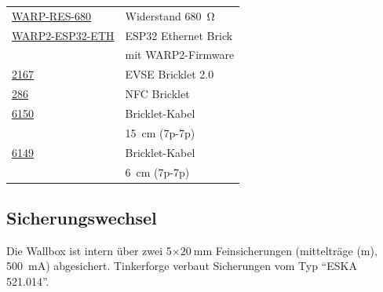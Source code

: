 \documentclass[a4paper,10pt]{article}
\begin{document}
\begin{multicols*}{2}
\begin{tabular}{ll}
        \cmidrule(lr{0.5em}){1-2}
        \href{https://www.tinkerforge.com/de/shop/warp/warp2-spare-parts/warp-res-680.html}{WARP-RES-680}                           & Widerstand \SI{680}{\ohm}            \\
        \cmidrule(lr{0.5em}){1-2}
        \href{https://www.tinkerforge.com/de/shop/warp/warp2-spare-parts/warp2-esp32-eth.html}{WARP2-ESP32-ETH}                        & ESP32 Ethernet Brick                 \\
                                                                                                                                    & mit WARP2-Firmware                   \\
        \cmidrule(lr{0.5em}){1-2}
        \href{https://www.tinkerforge.com/de/shop/warp/warp2-spare-parts/evse-v2-bricklet.html}{2167}                               & EVSE Bricklet 2.0                    \\
        \cmidrule(lr{0.5em}){1-2}
        \href{https://www.tinkerforge.com/de/shop/warp/warp2-spare-parts/nfc-bricklet.html}{286}                                    & NFC Bricklet                         \\
        \cmidrule(lr{0.5em}){1-2}
        \href{https://www.tinkerforge.com/de/shop/accessories/cable/bricklet-cable-15cm-7p-7p.html}{6150}                           & Bricklet-Kabel                       \\
                                                                                                                                    & \SI{15}{\centi\meter} (7p-7p)        \\
        \cmidrule(lr{0.5em}){1-2}
        \href{https://www.tinkerforge.com/de/shop/accessories/cable/bricklet-cable-6cm-7p-7p.html}{6149}                            & Bricklet-Kabel                       \\
                                                                                                                                    & \SI{6}{\centi\meter} (7p-7p)         \\
        \bottomrule
    \end{tabular}

    \subsection{Sicherungswechsel}
    Die Wallbox ist intern über zwei 5$\times\SI{20}{\milli\meter}$ Feinsicherungen (mittelträge (m), \SI{500}{\milli\ampere}) abgesichert.
    Tinkerforge verbaut Sicherungen vom Typ \enquote{ESKA 521.014}.


\end{multicols*}
\end{document}
